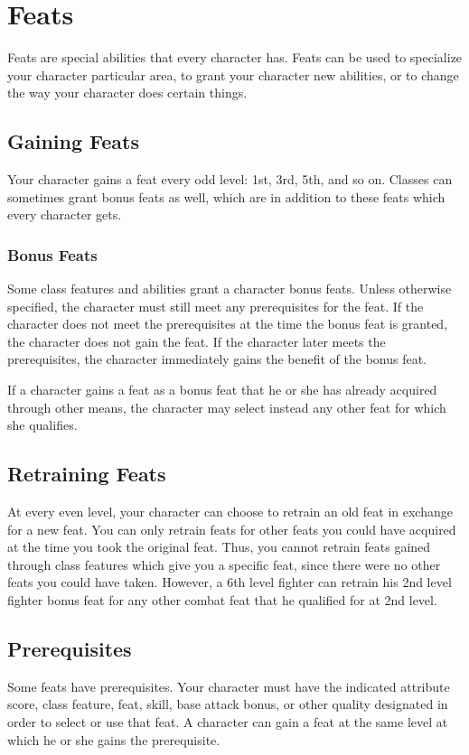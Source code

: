 \chapter{Feats}
Feats are special abilities that every character has. Feats can be used to specialize your character particular area, to grant your character new abilities, or to change the way your character does certain things.

\section{Gaining Feats}
Your character gains a feat every odd level: 1st, 3rd, 5th, and so on. Classes can sometimes grant bonus feats as well, which are in addition to these feats which every character gets.

\subsection{Bonus Feats}
Some class features and abilities grant a character bonus feats. Unless otherwise specified, the character must still meet any prerequisites for the feat. If the character does not meet the prerequisites at the time the bonus feat is granted, the character does not gain the feat. If the character later meets the prerequisites, the character immediately gains the benefit of the bonus feat.

If a character gains a feat as a bonus feat that he or she has already acquired through other means, the character may select instead any other feat for which she qualifies.

\section{Retraining Feats}
At every even level, your character can choose to retrain an old feat in exchange for a new feat. You can only retrain feats for other feats you could have acquired at the time you took the original feat. Thus, you cannot retrain feats gained through class features which give you a specific feat, since there were no other feats you could have taken. However, a 6th level fighter can retrain his 2nd level fighter bonus feat for any other combat feat that he qualified for at 2nd level.

\section{Prerequisites}
Some feats have prerequisites. Your character must have the indicated attribute score, class feature, feat, skill, base attack bonus, or other quality designated in order to select or use that feat. A character can gain a feat at the same level at which he or she gains the prerequisite.

